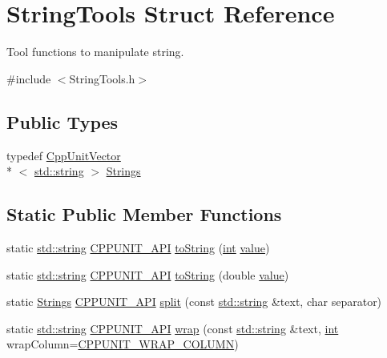 \hypertarget{struct_string_tools}{\section{String\-Tools Struct Reference}
\label{struct_string_tools}
}


Tool functions to manipulate string.  




{\ttfamily \#include $<$String\-Tools.\-h$>$}

\subsection*{Public Types}
\begin{DoxyCompactItemize}
\item 
typedef \hyperlink{_cpp_unit_vector_8h_ab1af16468212807e5cc231dc1ef32323}{Cpp\-Unit\-Vector}\\*
$<$ \hyperlink{glew_8h_ae84541b4f3d8e1ea24ec0f466a8c568b}{std\-::string} $>$ \hyperlink{struct_string_tools_ab01d065d80c39015955e9f765cd19921}{Strings}
\end{DoxyCompactItemize}
\subsection*{Static Public Member Functions}
\begin{DoxyCompactItemize}
\item 
static \hyperlink{glew_8h_ae84541b4f3d8e1ea24ec0f466a8c568b}{std\-::string} \hyperlink{_cpp_unit_api_8h_a0a4ad180f07bc3823bae0e453718ef6a}{C\-P\-P\-U\-N\-I\-T\-\_\-\-A\-P\-I} \hyperlink{struct_string_tools_a2b4a4cbbfa69a2c28c71bd519ba71e5c}{to\-String} (\hyperlink{wglew_8h_a500a82aecba06f4550f6849b8099ca21}{int} \hyperlink{fmod__dsp_8h_a6a4f8a1a444e9080b297963b3db29fe0}{value})
\item 
static \hyperlink{glew_8h_ae84541b4f3d8e1ea24ec0f466a8c568b}{std\-::string} \hyperlink{_cpp_unit_api_8h_a0a4ad180f07bc3823bae0e453718ef6a}{C\-P\-P\-U\-N\-I\-T\-\_\-\-A\-P\-I} \hyperlink{struct_string_tools_adfab22bf90b73231f635aa1ae299d4c4}{to\-String} (double \hyperlink{fmod__dsp_8h_a6a4f8a1a444e9080b297963b3db29fe0}{value})
\item 
static \hyperlink{struct_string_tools_ab01d065d80c39015955e9f765cd19921}{Strings} \hyperlink{_cpp_unit_api_8h_a0a4ad180f07bc3823bae0e453718ef6a}{C\-P\-P\-U\-N\-I\-T\-\_\-\-A\-P\-I} \hyperlink{struct_string_tools_ac3c3d30a35c82c1d5fcb54e915130767}{split} (const \hyperlink{glew_8h_ae84541b4f3d8e1ea24ec0f466a8c568b}{std\-::string} \&text, char separator)
\item 
static \hyperlink{glew_8h_ae84541b4f3d8e1ea24ec0f466a8c568b}{std\-::string} \hyperlink{_cpp_unit_api_8h_a0a4ad180f07bc3823bae0e453718ef6a}{C\-P\-P\-U\-N\-I\-T\-\_\-\-A\-P\-I} \hyperlink{struct_string_tools_a02d43819e61394264c3e75c24433a057}{wrap} (const \hyperlink{glew_8h_ae84541b4f3d8e1ea24ec0f466a8c568b}{std\-::string} \&text, \hyperlink{wglew_8h_a500a82aecba06f4550f6849b8099ca21}{int} wrap\-Column=\hyperlink{_portability_8h_a6e29fb5d905d3572ff64bb3ba5761349}{C\-P\-P\-U\-N\-I\-T\-\_\-\-W\-R\-A\-P\-\_\-\-C\-O\-L\-U\-M\-N})
\end{DoxyCompactItemize}


